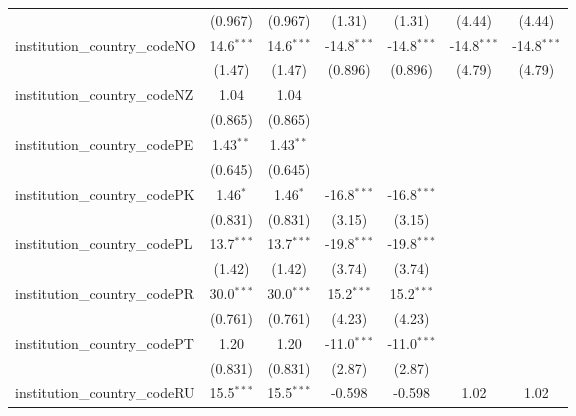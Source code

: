 \begin{tabular}{lcccccc}
                                         & (0.967)       & (0.967)       & (1.31)        & (1.31)        & (4.44)        & (4.44)\\   
   institution\_country\_codeNO          & 14.6$^{***}$  & 14.6$^{***}$  & -14.8$^{***}$ & -14.8$^{***}$ & -14.8$^{***}$ & -14.8$^{***}$\\   
                                         & (1.47)        & (1.47)        & (0.896)       & (0.896)       & (4.79)        & (4.79)\\   
   institution\_country\_codeNZ          & 1.04          & 1.04          &               &               &               &   \\   
                                         & (0.865)       & (0.865)       &               &               &               &   \\   
   institution\_country\_codePE          & 1.43$^{**}$   & 1.43$^{**}$   &               &               &               &   \\   
                                         & (0.645)       & (0.645)       &               &               &               &   \\   
   institution\_country\_codePK          & 1.46$^{*}$    & 1.46$^{*}$    & -16.8$^{***}$ & -16.8$^{***}$ &               &   \\   
                                         & (0.831)       & (0.831)       & (3.15)        & (3.15)        &               &   \\   
   institution\_country\_codePL          & 13.7$^{***}$  & 13.7$^{***}$  & -19.8$^{***}$ & -19.8$^{***}$ &               &   \\   
                                         & (1.42)        & (1.42)        & (3.74)        & (3.74)        &               &   \\   
   institution\_country\_codePR          & 30.0$^{***}$  & 30.0$^{***}$  & 15.2$^{***}$  & 15.2$^{***}$  &               &   \\   
                                         & (0.761)       & (0.761)       & (4.23)        & (4.23)        &               &   \\   
   institution\_country\_codePT          & 1.20          & 1.20          & -11.0$^{***}$ & -11.0$^{***}$ &               &   \\   
                                         & (0.831)       & (0.831)       & (2.87)        & (2.87)        &               &   \\   
   institution\_country\_codeRU          & 15.5$^{***}$  & 15.5$^{***}$  & -0.598        & -0.598        & 1.02          & 1.02\\   

\end{tabular}
